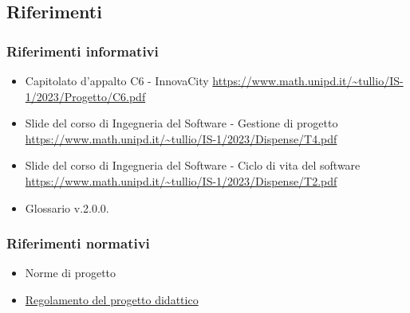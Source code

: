\subsection{Riferimenti}
\subsubsection{Riferimenti informativi}
    \begin{itemize}
        \item Capitolato d'appalto C6 - InnovaCity
        \url{https://www.math.unipd.it/~tullio/IS-1/2023/Progetto/C6.pdf}
        \item Slide del corso di Ingegneria del Software - Gestione di progetto
        \url{https://www.math.unipd.it/~tullio/IS-1/2023/Dispense/T4.pdf}
        \item Slide del corso di Ingegneria del Software - Ciclo di vita del software
        \url{https://www.math.unipd.it/~tullio/IS-1/2023/Dispense/T2.pdf}
        \item Glossario v.2.0.0.
    \end{itemize}
 
\subsubsection{Riferimenti normativi}
    \begin{itemize}
    \item Norme di progetto
    \item \href {https://www.math.unipd.it/~tullio/IS-1/2023/Dispense/PD2.pdf} {Regolamento del progetto didattico }
    \end{itemize}

\vspace{0.5cm}